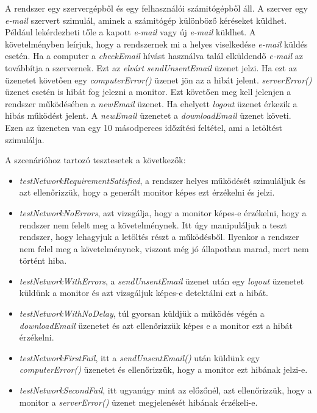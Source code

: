 A rendszer egy szervergépből és egy felhasználói számitógépből áll.
A szerver egy \textit{e-mail} szervert szimulál, aminek a számitógép különböző kéréseket küldhet.
Például lekérdezheti tőle a kapott \textit{e-mail} vagy új \textit{e-mail} küldhet.
A követelményben leírjuk, hogy a rendszernek mi a helyes viselkedése \textit{e-mail} küldés esetén.
Ha a computer a \textit{checkEmail} hívást használva talál elküldendő \textit{e-mail} az továbbítja a szervernek.
Ezt az \textit{elvárt} \textit{sendUnsentEmail} üzenet jelzi.
Ha ezt az üzenetet követően egy \textit{computerError()} üzenet jön az a hibát jelent.
\textit{serverError()} üzenet esetén is hibát fog jelezni a monitor.
Ezt követően meg kell jelenjen a rendszer működésében a \textit{newEmail} üzenet.
Ha ehelyett \textit{logout} üzenet érkezik a hibás működést jelent.
A \textit{newEmail} üzenetet a \textit{downloadEmail} üzenet követi.
Ezen az üzeneten van egy 10 másodperces időzítési feltétel, ami a letöltést szimulálja.

A szcenárióhoz tartozó tesztesetek a következők:
\begin{itemize}
    \item \textit{testNetworkRequirementSatisfied}, a rendszer helyes működését szimuláljuk és azt ellenőrizzük, hogy a generált monitor képes ezt érzékelni és jelzi.
    \item \textit{testNetworkNoErrors}, azt vizsgálja, hogy a monitor képes-e érzékelni, hogy a rendszer nem felelt meg a követelménynek.
    Itt úgy manipuláljuk a teszt rendszer, hogy lehagyjuk a letöltés részt a működésből.
    Ilyenkor a rendszer nem felel meg a követelménynek, viszont még jó állapotban marad, mert nem történt hiba.
    \item \textit{testNetworkWithErrors}, a \textit{sendUnsentEmail} üzenet után egy \textit{logout} üzenetet küldünk a monitor és azt vizsgáljuk képes-e detektálni ezt a hibát.
    \item \textit{testNetworkWithNoDelay}, túl gyorsan küldjük a működés végén a \textit{downloadEmail} üzenetet és azt ellenőrizzük képes e a monitor ezt a hibát érzékelni.
    \item \textit{testNetworkFirstFail}, itt a \textit{sendUnsentEmail()} után küldünk egy \textit{computerError()} üzenetet és ellenőrizzük, hogy a monitor ezt hibának jelzi-e.
    \item \textit{testNetworkSecondFail}, itt ugyanúgy mint az előzőnél, azt ellenőrizzük, hogy a monitor a \textit{serverError()} üzenet megjelenését hibának érzékeli-e.
\end{itemize}

